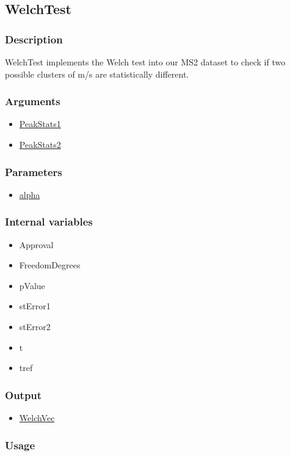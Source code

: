 \subsection{WelchTest}\label{WelchTest}
\subsubsection{Description}

WelchTest implements the Welch test into our MS2 dataset to check if two possible clusters of m/s are statistically different.
\subsubsection{Arguments}
\begin{itemize}
\item \hyperref[PeakStats]{PeakStats1}
\item \hyperref[PeakStats]{PeakStats2}
\end{itemize}
\subsubsection{Parameters}
\begin{itemize}
\item \hyperref[alpha]{alpha}
\end{itemize}
\subsubsection{Internal variables}
\begin{itemize}
\item Approval
\item FreedomDegrees
\item pValue
\item stError1
\item stError2
\item t
\item tref
\end{itemize}
\subsubsection{Output}
\begin{itemize}
\item \hyperref[WelchVec]{WelchVec} 
\end{itemize}
\subsubsection{Usage}
